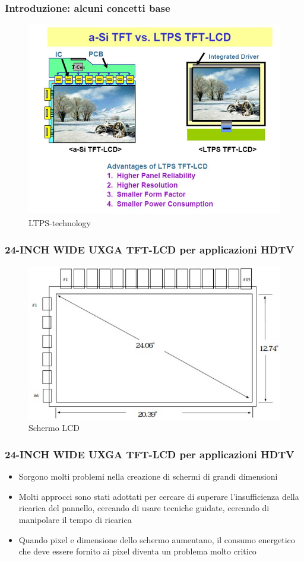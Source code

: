 \documentclass[12pt]{beamer}
\begin{document}
	\begin{frame}
		\frametitle{Introduzione: alcuni concetti base}
		\begin{figure}
			\centering
			\includegraphics[width=1\linewidth]{IMMAGINI/ltps-(technology)}
			\caption{LTPS-technology}
			\label{fig:ltps-technology}
		\end{figure}
	\end{frame}
	\begin{frame}
		\frametitle{24-INCH WIDE UXGA TFT-LCD per applicazioni HDTV}
		\begin{figure}
			\centering
			\includegraphics[width=1\linewidth]{IMMAGINI/schermoLCD}
			\caption{Schermo LCD}
			\label{fig:schermolcd}
		\end{figure}
	\end{frame}
	\begin{frame}
		\frametitle{24-INCH WIDE UXGA TFT-LCD per applicazioni HDTV}
		\begin{itemize}
			\item Sorgono molti problemi nella creazione di schermi di grandi dimensioni
			\pause
			\item Molti approcci sono stati adottati per cercare di superare l’insufficienza della ricarica del pannello,
			cercando di usare tecniche guidate, cercando di manipolare il tempo di ricarica
			\pause
			\item Quando pixel e dimensione dello schermo aumentano, il consumo energetico che deve essere fornito ai pixel diventa un problema molto critico
		\end{itemize}
	\end{frame}
\end{document}
